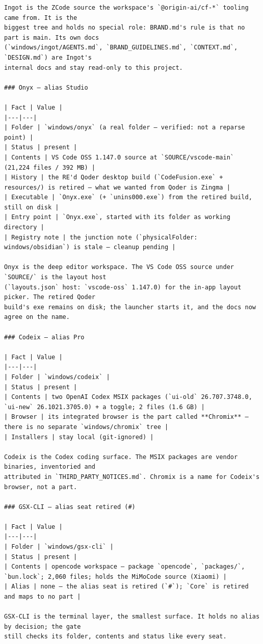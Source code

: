 \begin{Verbatim}[breaklines,breakanywhere,fontsize=\footnotesize]
Ingot is the ZCode source the workspace's `@origin-ai/cf-*` tooling came from. It is the
biggest tree and holds no special role: BRAND.md's rule is that no part is main. Its own docs
(`windows/ingot/AGENTS.md`, `BRAND_GUIDELINES.md`, `CONTEXT.md`, `DESIGN.md`) are Ingot's
internal docs and stay read-only to this project.

### Onyx — alias Studio

| Fact | Value |
|---|---|
| Folder | `windows/onyx` (a real folder — verified: not a reparse point) |
| Status | present |
| Contents | VS Code OSS 1.147.0 source at `SOURCE/vscode-main` (21,224 files / 392 MB) |
| History | the RE'd Qoder desktop build (`CodeFusion.exe` + resources/) is retired — what we wanted from Qoder is Zingma |
| Executable | `Onyx.exe` (+ `unins000.exe`) from the retired build, still on disk |
| Entry point | `Onyx.exe`, started with its folder as working directory |
| Registry note | the junction note (`physicalFolder: windows/obsidian`) is stale — cleanup pending |

Onyx is the deep editor workspace. The VS Code OSS source under `SOURCE/` is the layout host
(`layouts.json` host: `vscode-oss` 1.147.0) for the in-app layout picker. The retired Qoder
build's exe remains on disk; the launcher starts it, and the docs now agree on the name.

### Codeix — alias Pro

| Fact | Value |
|---|---|
| Folder | `windows/codeix` |
| Status | present |
| Contents | two OpenAI Codex MSIX packages (`ui-old` 26.707.3748.0, `ui-new` 26.1021.3705.0) + a toggle; 2 files (1.6 GB) |
| Browser | its integrated browser is the part called **Chromix** — there is no separate `windows/chromix` tree |
| Installers | stay local (git-ignored) |

Codeix is the Codex coding surface. The MSIX packages are vendor binaries, inventoried and
attributed in `THIRD_PARTY_NOTICES.md`. Chromix is a name for Codeix's browser, not a part.

### GSX-CLI — alias seat retired (#)

| Fact | Value |
|---|---|
| Folder | `windows/gsx-cli` |
| Status | present |
| Contents | opencode workspace — package `opencode`, `packages/`, `bun.lock`; 2,060 files; holds the MiMoCode source (Xiaomi) |
| Alias | none — the alias seat is retired (`#`); `Core` is retired and maps to no part |

GSX-CLI is the terminal layer, the smallest surface. It holds no alias by decision; the gate
still checks its folder, contents and status like every seat.


\end{Verbatim}
